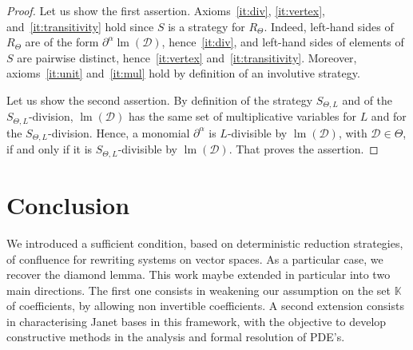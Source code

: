 \documentclass[11pt]{article}
\theoremstyle{definition}
\newcommand\D{\mathcal{D}}
\DeclareMathOperator{\lm}{lm}
\newcommand\K{\mathbb{K}}
\newcommand\RTheta{R_{\Theta}}
\newcommand\SThetaL{S_{\Theta,L}}
\begin{document}
\begin{proof}
  Let us show the first assertion. Axioms~\ref{it:div}, \ref{it:vertex},
  and~\ref{it:transitivity} hold since $S$ is a strategy for $\RTheta$.
  Indeed, left-hand sides of $\RTheta$ are of the form
  $\partial^\alpha\lm(\D)$, hence~\ref{it:div}, and left-hand sides of
  elements of $S$ are pairwise distinct, hence~\ref{it:vertex}
  and~\ref{it:transitivity}. Moreover, axioms~\ref{it:unit}
  and~\ref{it:mul} hold by definition of an involutive strategy.

  Let us show the second assertion. By definition of the strategy
  $\SThetaL$ and of the $\SThetaL$-division, $\lm(\D)$ has the same set
  of multiplicative variables for $L$ and for the $\SThetaL$-division.
  Hence, a monomial $\partial^\alpha$ is $L$-divisible by $\lm(\D)$, with
  $\D\in\Theta$, if and only if it is $\SThetaL$-divisible by $\lm(\D)$.
  That proves the assertion.
\end{proof}

\section{Conclusion}

We introduced a sufficient condition,
based on deterministic reduction strategies, of confluence for
rewriting systems on vector spaces. As a particular case,
we recover the diamond lemma. This work maybe extended in particular
into two main directions. The first one consists in weakening our assumption
on the set $\K$ of coefficients, by allowing non invertible coefficients.
A second extension consists in characterising Janet bases in this framework,
with the objective to develop constructive methods in the analysis and formal
resolution of PDE's.


\end{document}
